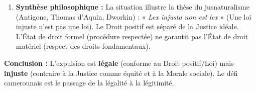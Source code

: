 \documentclass[11pt]{article}
\newcommand{\cle}[1]{{\popxbold\color{popdark}#1}}
\begin{document}
\begin{exoresolu}
\begin{enumerate}
\begin{itemize}
            \end{itemize}
        \item \textbf{Synthèse philosophique :} La situation illustre la thèse du \cle{jusnaturalisme} (Antigone, Thomas d'Aquin, Dworkin) : « \emph{Lex injusta non est lex} » (Une loi injuste n'est pas une loi). Le Droit positif est séparé de la Justice idéale. L'État de droit formel (procédure respectée) ne garantit pas l'État de droit matériel (respect des droits fondamentaux).
    \end{enumerate}
    \textbf{Conclusion :} L'expulsion est \textbf{légale} (conforme au Droit positif/Loi) mais \textbf{injuste} (contraire à la Justice comme équité et à la Morale sociale). Le défi camerounais est le passage de la \cle{légalité} à la \cle{légitimité}.
\end{exoresolu}
\end{document}
